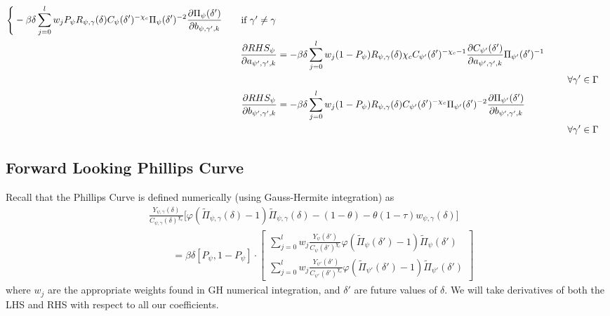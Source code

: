 \documentclass[11pt]{article}
\begin{document}
\begin{align}
\begin{cases}
\begin{aligned}
&-\beta\delta\sum_{j = 0}^{l}w_j P_{\psi}R_{\psi,\gamma}(\delta)C_{\psi}(\delta')^{-\chi_{c}}\Pi_{\psi}(\delta')^{-2}\frac{\partial \Pi_{\psi}(\delta')}{\partial b_{\psi,\gamma',k}}
\end{aligned} & \text{if } \gamma' \neq \gamma 
\end{cases}\\
\frac{\partial RHS_{\psi}}{\partial a_{\psi',\gamma',k}} &=
-\beta\delta\sum_{j = 0}^{l}w_j (1-P_{\psi})R_{\psi,\gamma}(\delta)\chi_{c}C_{\psi'}(\delta')^{-\chi_{c}-1}\frac{\partial C_{\psi'}(\delta')}{\partial a_{\psi',\gamma',k}}\Pi_{\psi'}(\delta')^{-1} \nonumber \\
&\hspace{10.75cm} \forall\gamma'\in\Gamma \\
\frac{\partial RHS_{\psi}}{\partial b_{\psi',\gamma',k}} & =
-\beta\delta\sum_{j = 0}^{l}w_j (1-P_{\psi})R_{\psi,\gamma}(\delta)C_{\psi'}(\delta')^{-\chi_{c}}\Pi_{\psi'}(\delta')^{-2}\frac{\partial \Pi_{\psi'}(\delta')}{\partial b_{\psi',\gamma',k}} \nonumber \\
&\hspace{10.75cm} \forall\gamma'\in\Gamma
\end{align}


\subsection*{Forward Looking Phillips Curve}
\noindent 
Recall that the Phillips Curve is defined numerically (using Gauss-Hermite integration) as 
\begin{align}
&\frac{Y_{\psi,\gamma}(\delta)}{C_{\psi,\gamma}(\delta)^{\chi_{c}}}\bigl[ \varphi (\tilde{\Pi}_{\psi,\gamma}(\delta) - 1)\tilde{\Pi}_{\psi,\gamma}(\delta) - (1 - \theta) - \theta (1-\tau)w_{\psi,\gamma}(\delta)\bigr] \nonumber \\ 
& \hspace{1cm }=  \beta\delta\left[P_{\psi}, 1-P_{\psi}\right]\cdot
\begin{bmatrix}
\sum_{j = 0}^{l}w_j\frac{Y_{\psi}(\delta')}{C_{\psi}(\delta')^{\chi_{c}}}\varphi (\tilde{\Pi}_{\psi}(\delta') - 1)\tilde{\Pi}_{\psi}(\delta')\\
\sum_{j = 0}^{l}w_j\frac{Y_{\psi'}(\delta')}{C_{\psi'}(\delta')^{\chi_{c}}}\varphi (\tilde{\Pi}_{\psi'}(\delta') - 1)\tilde{\Pi}_{\psi'}(\delta')
\end{bmatrix}
\end{align}
where $w_j$ are the appropriate weights found in GH numerical integration, and $\delta'$ are future values of $\delta$. We will take derivatives of both the LHS and RHS with respect to all our coefficients.
\end{document}
